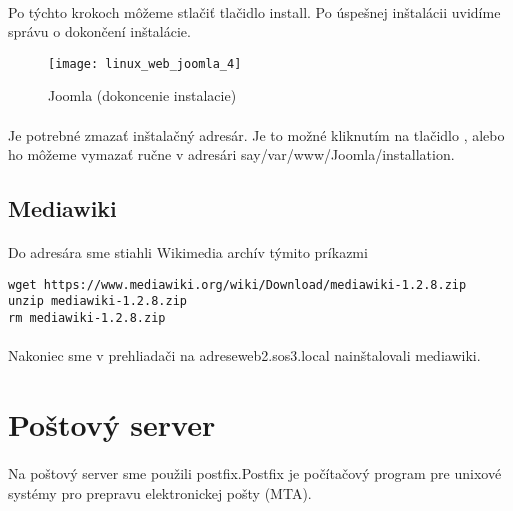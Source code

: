 \paragraph{}
Po týchto krokoch môžeme stlačiť tlačidlo install. Po úspešnej inštalácii uvidíme správu o dokončení inštalácie.

\begin{figure}[!htb]
\centering
\texttt{[image: linux\_web\_joomla\_4]}
\caption{Joomla (dokoncenie instalacie)}
\label{fig:web_joomla_finish}
\end{figure}

\paragraph{}
Je potrebné zmazať inštalačný adresár. Je to možné kliknutím na tlačidlo , alebo ho môžeme vymazať ručne v adresári say{/var/www/Joomla/installation}.

\subsection{Mediawiki}
\paragraph{}
Do adresára  sme stiahli Wikimedia archív týmito príkazmi

\noindent
{\selectfont
\begin{small}
\begin{verbatim}
wget https://www.mediawiki.org/wiki/Download/mediawiki-1.2.8.zip
unzip mediawiki-1.2.8.zip
rm mediawiki-1.2.8.zip
\end{verbatim}
\end{small}
}

\paragraph{}
Nakoniec sme v prehliadači na adreseweb2.sos3.local nainštalovali mediawiki.

\section{Poštový server}
\paragraph{}
Na poštový server sme použili postfix.Postfix je počítačový program pre unixové systémy pro prepravu elektronickej pošty (MTA).
